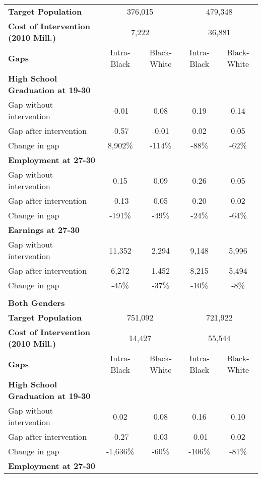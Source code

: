 \begin{table}[htbp]
\begin{center}
\begin{tabular}{lcccc}
\textbf{Target Population} &\multicolumn{2}{c}{     376,015} &\multicolumn{2}{c}{     479,348}  \\[0.1cm]  
\textbf{Cost of Intervention (2010 Mill.)} &\multicolumn{2}{c}{       7,222} &\multicolumn{2}{c}{      36,881}  \\[0.1cm]  
\textbf{Gaps}&Intra-Black &Black-White &Intra-Black &Black-White  \\[0.1cm] \textbf{ High School Graduation at 19-30} &&&& \\[0.02cm]  
 Gap without intervention &       -0.01&        0.08&        0.19&        0.14 \\[0.02cm]   Gap after intervention &       -0.57&       -0.01&        0.02&        0.05 \\[0.02cm]   Change in gap &       8,902\%&        -114\%&         -88\%&         -62\% \\[0.1cm]  \textbf{ Employment at 27-30} &&&& \\[0.02cm]  
 Gap without intervention &        0.15&        0.09&        0.26&        0.05 \\[0.02cm]   Gap after intervention &       -0.13&        0.05&        0.20&        0.02 \\[0.02cm]   Change in gap &        -191\%&         -49\%&         -24\%&         -64\% \\[0.1cm]  \textbf{ Earnings at 27-30} &&&& \\[0.02cm]  
 Gap without intervention &      11,352&       2,294&       9,148&       5,996 \\[0.02cm]   Gap after intervention &       6,272&       1,452&       8,215&       5,494 \\[0.02cm]   Change in gap &         -45\%&         -37\%&         -10\%&          -8\% \\[0.1cm]   \\[0.2cm]  \hline 
 \textbf{Both Genders} & & & &  \\[0.1cm]  
\textbf{Target Population} &\multicolumn{2}{c}{     751,092} &\multicolumn{2}{c}{     721,922}  \\[0.1cm]  
\textbf{Cost of Intervention (2010 Mill.)} &\multicolumn{2}{c}{      14,427} &\multicolumn{2}{c}{      55,544}  \\[0.1cm]  
\textbf{Gaps}&Intra-Black &Black-White &Intra-Black &Black-White  \\[0.1cm] \textbf{ High School Graduation at 19-30} &&&& \\[0.02cm]  
 Gap without intervention &        0.02&        0.08&        0.16&        0.10 \\[0.02cm]   Gap after intervention &       -0.27&        0.03&       -0.01&        0.02 \\[0.02cm]   Change in gap &      -1,636\%&         -60\%&        -106\%&         -81\% \\[0.1cm]  \textbf{ Employment at 27-30} &&&& \\[0.02cm]  

\end{tabular}
\end{center}
\end{table}
